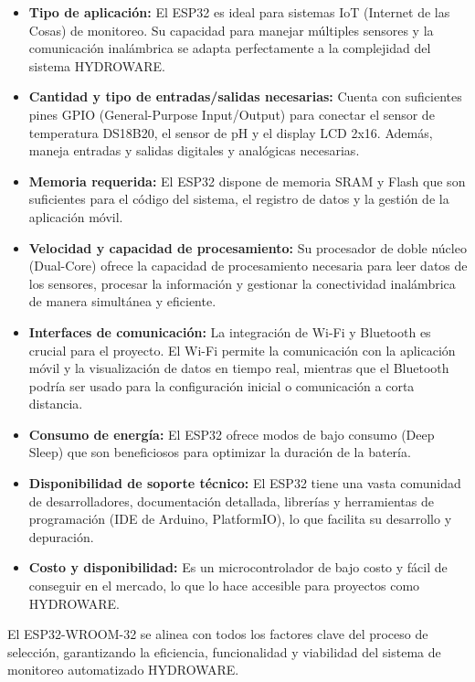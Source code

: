 \documentclass[a4paper,12pt]{article}
\begin{document}
	\begin{itemize}
		\item \textbf{Tipo de aplicación:} El ESP32 es ideal para sistemas IoT (Internet de las Cosas) de monitoreo. Su capacidad para manejar múltiples sensores y la comunicación inalámbrica se adapta perfectamente a la complejidad del sistema HYDROWARE.
		\item \textbf{Cantidad y tipo de entradas/salidas necesarias:} Cuenta con suficientes pines GPIO (General-Purpose Input/Output) para conectar el sensor de temperatura DS18B20, el sensor de pH y el display LCD 2x16. Además, maneja entradas y salidas digitales y analógicas necesarias.
		\item \textbf{Memoria requerida:} El ESP32 dispone de memoria SRAM y Flash que son suficientes para el código del sistema, el registro de datos y la gestión de la aplicación móvil.
		\item \textbf{Velocidad y capacidad de procesamiento:} Su procesador de doble núcleo (Dual-Core) ofrece la capacidad de procesamiento necesaria para leer datos de los sensores, procesar la información y gestionar la conectividad inalámbrica de manera simultánea y eficiente.
		\item \textbf{Interfaces de comunicación:} La integración de Wi-Fi y Bluetooth es crucial para el proyecto. El Wi-Fi permite la comunicación con la aplicación móvil y la visualización de datos en tiempo real, mientras que el Bluetooth podría ser usado para la configuración inicial o comunicación a corta distancia.
		\item \textbf{Consumo de energía:} El ESP32 ofrece modos de bajo consumo (Deep Sleep) que son beneficiosos para optimizar la duración de la batería.
		\item \textbf{Disponibilidad de soporte técnico:} El ESP32 tiene una vasta comunidad de desarrolladores, documentación detallada, librerías y herramientas de programación (IDE de Arduino, PlatformIO), lo que facilita su desarrollo y depuración.
		\item \textbf{Costo y disponibilidad:} Es un microcontrolador de bajo costo y fácil de conseguir en el mercado, lo que lo hace accesible para proyectos como HYDROWARE.
	\end{itemize}
	
	El ESP32-WROOM-32 se alinea con todos los factores clave del proceso de selección, garantizando la eficiencia, funcionalidad y viabilidad del sistema de monitoreo automatizado HYDROWARE.
	\vspace{0.5cm}
	
\end{document}
